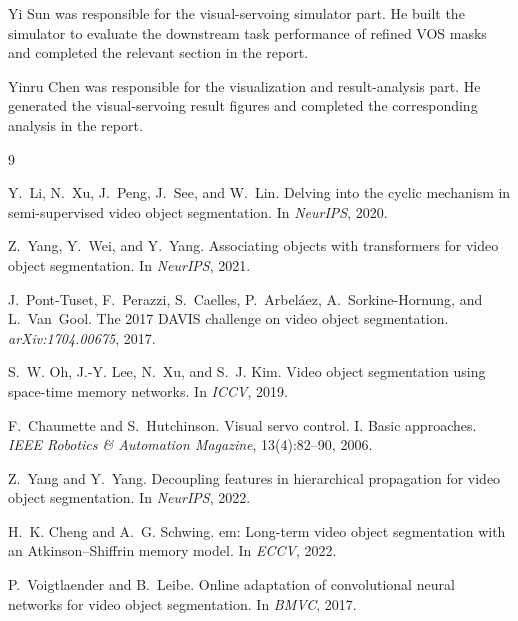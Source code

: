 \documentclass{article}
\begin{document}
Yi Sun was responsible for the visual-servoing simulator part. He built the simulator to evaluate the 
downstream task performance of refined VOS masks and completed the relevant section in the report.

Yinru Chen was responsible for the visualization and result-analysis part. He generated the visual-servoing result figures and completed the corresponding analysis in the report.




{\footnotesize
\setlength{\bibsep}{0pt plus 0.2ex}
\begin{thebibliography}{9}
\providecommand{\natexlab}[1]{#1}

Y.~Li, N.~Xu, J.~Peng, J.~See, and W.~Lin.
\newblock Delving into the cyclic mechanism in semi-supervised video object segmentation.
\newblock In \emph{NeurIPS}, 2020.

Z.~Yang, Y.~Wei, and Y.~Yang.
\newblock Associating objects with transformers for video object segmentation.
\newblock In \emph{NeurIPS}, 2021.

J.~Pont-Tuset, F.~Perazzi, S.~Caelles, P.~Arbel\'aez, A.~Sorkine-Hornung, and L.~Van~Gool.
\newblock The 2017 {DAVIS} challenge on video object segmentation.
\newblock \emph{arXiv:1704.00675}, 2017.

S.~W. Oh, J.-Y. Lee, N.~Xu, and S.~J. Kim.
\newblock Video object segmentation using space-time memory networks.
\newblock In \emph{ICCV}, 2019.

F.~Chaumette and S.~Hutchinson.
\newblock Visual servo control. {I}. {B}asic approaches.
\newblock \emph{IEEE Robotics \& Automation Magazine}, 13(4):82--90, 2006.

Z.~Yang and Y.~Yang.
\newblock Decoupling features in hierarchical propagation for video object segmentation.
\newblock In \emph{NeurIPS}, 2022.

H.~K. Cheng and A.~G. Schwing.
em: Long-term video object segmentation with an {A}tkinson--{S}hiffrin memory model.
\newblock In \emph{ECCV}, 2022.

P.~Voigtlaender and B.~Leibe.
\newblock Online adaptation of convolutional neural networks for video object segmentation.
\newblock In \emph{BMVC}, 2017.

\end{thebibliography}
}
\end{document}
